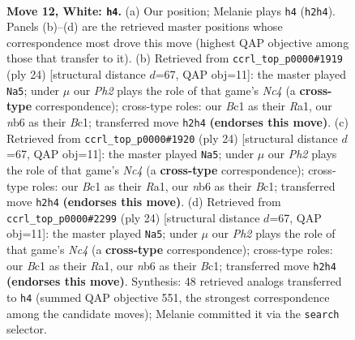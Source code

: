 \documentclass[11pt]{article}
\begin{document}
\clearpage

\begin{figure}[p]\centering
\begin{subfigure}{0.46\textwidth}\centering
\resizebox{\linewidth}{!}{%
\newchessgame
\chessboard[
  setfen={r3k1r1/ppp1ppbp/1nn3p1/4P3/6b1/NB3N2/PPP2PPP/R1BK2R1 w q - 3 12},
  showmover=false,
  pgfstyle=straightmove, color=movearrow, markmove={h2-h4}
]}
\caption{}
\end{subfigure}\hfill
\begin{subfigure}{0.46\textwidth}\centering
\resizebox{\linewidth}{!}{%
\newchessgame
\chessboard[
  setfen={r3k2r/pp1n1ppp/2p1pn2/8/1bNP4/1P3NP1/1Pb1PPBP/R1B2RK1 w kq - 3 13},
  showmover=false,
  pgfstyle=straightmove, color=movearrow, markmove={c4-a5}
]}
\caption{}
\end{subfigure}
\\[4pt]
\begin{subfigure}{0.46\textwidth}\centering
\resizebox{\linewidth}{!}{%
\newchessgame
\chessboard[
  setfen={r3k2r/pp1n1ppp/2p1pn2/8/1bNP4/1P3NP1/1Pb1PPBP/R1B2RK1 w kq - 3 13},
  showmover=false,
  pgfstyle=straightmove, color=movearrow, markmove={c4-a5}
]}
\caption{}
\end{subfigure}\hfill
\begin{subfigure}{0.46\textwidth}\centering
\resizebox{\linewidth}{!}{%
\newchessgame
\chessboard[
  setfen={r3k2r/pp1n1ppp/2p1pn2/8/1bNP4/1P3NP1/1Pb1PPBP/R1B2RK1 w kq - 3 13},
  showmover=false,
  pgfstyle=straightmove, color=movearrow, markmove={c4-a5}
]}
\caption{}
\end{subfigure}
\caption{\textbf{Move 12, White: \texttt{h4}.} (a) Our position; Melanie plays \texttt{h4} (\texttt{h2h4}). Panels (b)--(d) are the retrieved master positions whose correspondence most drove this move (highest QAP objective among those that transfer to it). (b) Retrieved from \texttt{ccrl\_top\_p0000\#1919} (ply 24) [structural distance $d$=67, QAP obj=11]: the master played \texttt{Na5}; under $\mu$ our \emph{Ph2} plays the role of that game's \emph{Nc4} (a \textbf{cross-type} correspondence); cross-type roles: our \emph{B}c1 as their \emph{R}a1, our \emph{n}b6 as their \emph{B}c1; transferred move \texttt{h2h4} \textbf{(endorses this move)}. (c) Retrieved from \texttt{ccrl\_top\_p0000\#1920} (ply 24) [structural distance $d$=67, QAP obj=11]: the master played \texttt{Na5}; under $\mu$ our \emph{Ph2} plays the role of that game's \emph{Nc4} (a \textbf{cross-type} correspondence); cross-type roles: our \emph{B}c1 as their \emph{R}a1, our \emph{n}b6 as their \emph{B}c1; transferred move \texttt{h2h4} \textbf{(endorses this move)}. (d) Retrieved from \texttt{ccrl\_top\_p0000\#2299} (ply 24) [structural distance $d$=67, QAP obj=11]: the master played \texttt{Na5}; under $\mu$ our \emph{Ph2} plays the role of that game's \emph{Nc4} (a \textbf{cross-type} correspondence); cross-type roles: our \emph{B}c1 as their \emph{R}a1, our \emph{n}b6 as their \emph{B}c1; transferred move \texttt{h2h4} \textbf{(endorses this move)}. Synthesis: 48 retrieved analogs transferred to \texttt{h4} (summed QAP objective 551, the strongest correspondence among the candidate moves); Melanie committed it via the \texttt{search} selector.}
\label{fig:thought-m22}
\end{figure}
\end{document}
